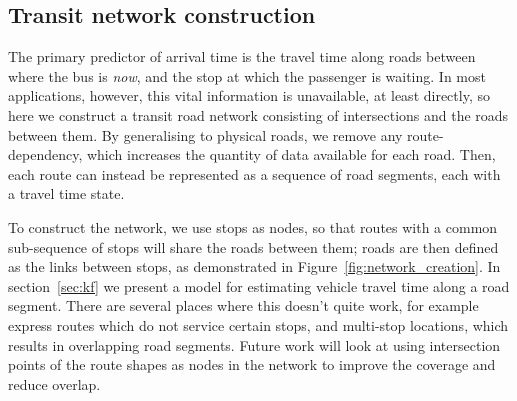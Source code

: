 \subsection{Transit network construction}
\label{sec:network_build}

The primary predictor of arrival time is 
the travel time along roads between where the bus is \emph{now},
and the stop at which the passenger is waiting.
In most applications, however, this vital information is unavailable,
at least directly,
so here we construct a transit road network consisting of intersections
and the roads between them.
By generalising to physical roads,
we remove any route-dependency,
which increases the quantity of data available for each road.
Then, each route can instead be represented as a sequence of road segments,
each with a travel time state.


To construct the network,
we use stops as nodes, so that
routes with a common sub-sequence of stops will share the roads between them;
roads are then defined as the links between stops,
as demonstrated in Figure~\ref{fig:network_creation}.
In section~\ref{sec:kf} we present a model for estimating vehicle travel time
along a road segment.
There are several places where this doesn't quite work, 
for example express routes which do not service certain stops,
and multi-stop locations,
which results in overlapping road segments.
Future work will look at using intersection points of the route shapes
as nodes in the network to improve the coverage and reduce overlap.

